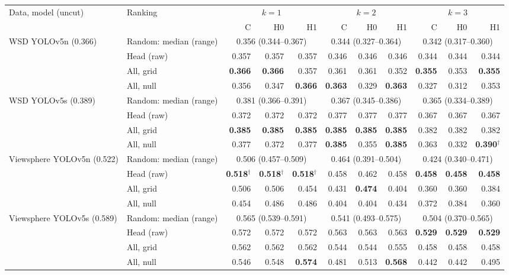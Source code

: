 \begin{tabular}{llrrrrrrrrr}
\toprule
Data, model (uncut) & Ranking & \multicolumn{3}{c}{$k=1$} & \multicolumn{3}{c}{$k=2$} & \multicolumn{3}{c}{$k=3$} \\
\cmidrule(lr){3-5}\cmidrule(lr){6-8}\cmidrule(lr){9-11}
 & & C & H0 & H1 & C & H0 & H1 & C & H0 & H1 \\
\midrule
WSD YOLOv5n (0.366) & Random: median (range) & \multicolumn{3}{c}{0.356 (0.344--0.367)} & \multicolumn{3}{c}{0.344 (0.327--0.364)} & \multicolumn{3}{c}{0.342 (0.317--0.360)} \\
 & Head (raw) & 0.357 & 0.357 & 0.357 & 0.346 & 0.346 & 0.346 & 0.344 & 0.344 & 0.344 \\
 & All, grid & \textbf{0.366} & \textbf{0.366} & 0.357 & 0.361 & 0.361 & 0.352 & \textbf{0.355} & 0.353 & \textbf{0.355} \\
 & All, null & 0.356 & 0.347 & \textbf{0.366} & \textbf{0.363} & 0.329 & \textbf{0.363} & 0.327 & 0.312 & 0.353 \\
\midrule
WSD YOLOv5s (0.389) & Random: median (range) & \multicolumn{3}{c}{0.381 (0.366--0.391)} & \multicolumn{3}{c}{0.367 (0.345--0.386)} & \multicolumn{3}{c}{0.365 (0.334--0.389)} \\
 & Head (raw) & 0.372 & 0.372 & 0.372 & 0.377 & 0.377 & 0.377 & 0.367 & 0.367 & 0.367 \\
 & All, grid & \textbf{0.385} & \textbf{0.385} & \textbf{0.385} & \textbf{0.385} & \textbf{0.385} & \textbf{0.385} & 0.382 & 0.382 & 0.382 \\
 & All, null & 0.377 & 0.372 & 0.377 & \textbf{0.385} & 0.355 & \textbf{0.385} & 0.363 & 0.332 & \textbf{0.390$^\dagger$} \\
\midrule
Viewsphere YOLOv5n (0.522) & Random: median (range) & \multicolumn{3}{c}{0.506 (0.457--0.509)} & \multicolumn{3}{c}{0.464 (0.391--0.504)} & \multicolumn{3}{c}{0.424 (0.340--0.471)} \\
 & Head (raw) & \textbf{0.518$^\dagger$} & \textbf{0.518$^\dagger$} & \textbf{0.518$^\dagger$} & 0.458 & 0.462 & 0.458 & \textbf{0.458} & \textbf{0.458} & \textbf{0.458} \\
 & All, grid & 0.506 & 0.506 & 0.454 & 0.431 & \textbf{0.474} & 0.404 & 0.360 & 0.360 & 0.384 \\
 & All, null & 0.454 & 0.486 & 0.486 & 0.404 & 0.404 & 0.434 & 0.372 & 0.384 & 0.360 \\
\midrule
Viewsphere YOLOv5s (0.589) & Random: median (range) & \multicolumn{3}{c}{0.565 (0.539--0.591)} & \multicolumn{3}{c}{0.541 (0.493--0.575)} & \multicolumn{3}{c}{0.504 (0.370--0.565)} \\
 & Head (raw) & 0.572 & 0.572 & 0.572 & 0.563 & 0.563 & 0.563 & \textbf{0.529} & \textbf{0.529} & \textbf{0.529} \\
 & All, grid & 0.562 & 0.562 & 0.562 & 0.544 & 0.544 & 0.555 & 0.458 & 0.458 & 0.458 \\
 & All, null & 0.546 & 0.548 & \textbf{0.574} & 0.481 & 0.513 & \textbf{0.568} & 0.442 & 0.442 & 0.495 \\
\bottomrule
\end{tabular}
